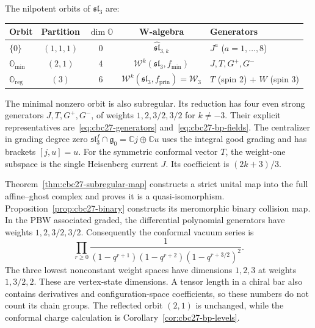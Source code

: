 \begin{computation}
\label{comp:sl3-ds-hierarchy}
The nilpotent orbits of $\mathfrak{sl}_3$ are:
\begin{center}
\renewcommand{\arraystretch}{1.2}
\begin{tabular}{lcccl}
\textbf{Orbit} & \textbf{Partition} & \textbf{$\dim \mathbb{O}$} &
\textbf{W-algebra} & \textbf{Generators} \\
\hline
$\{0\}$ & $(1,1,1)$ & $0$ & $\widehat{\mathfrak{sl}}_{3,k}$ &
$J^a$ ($a = 1,\ldots,8$) \\
$\mathbb{O}_{\min}$ & $(2,1)$ & $4$ &
$\mathcal{W}^k(\mathfrak{sl}_3, f_{\min})$ &
$J,T,G^+,G^-$ \\
$\mathbb{O}_{\mathrm{reg}}$ & $(3)$ & $6$ &
$\mathcal{W}^k(\mathfrak{sl}_3, f_{\mathrm{prin}}) = \mathcal{W}_3$ &
$T$ (spin 2) + $W$ (spin 3)
\end{tabular}
\end{center}

The minimal nonzero orbit is also subregular.
Its reduction has four even strong generators $J,T,G^+,G^-$, of weights $1,2,3/2,3/2$ for $k\ne-3$.
Their explicit representatives are~\eqref{eq:cbc27-generators} and~\eqref{eq:cbc27-bp-fields}.
The centralizer in grading degree zero $\mathfrak{sl}_3^f\cap\mathfrak g_0=\mathbb Cj\oplus\mathbb Cu$
uses the integral good grading and has brackets $[j,u]=u$.
For the symmetric conformal vector $T$, the weight-one subspace is the single Heisenberg current $J$.
Its coefficient is $(2k+3)/3$.

Theorem~\ref{thm:cbc27-subregular-map} constructs a strict unital map into the full affine--ghost complex and proves it is a quasi-isomorphism.
Proposition~\ref{prop:cbc27-binary} constructs its meromorphic binary collision map.
In the PBW associated graded, the differential polynomial generators have weights $1,2,3/2,3/2$.
Consequently the conformal vacuum series is
\[
 \prod_{r\geq0}\frac{1}{(1-q^{r+1})(1-q^{r+2})(1-q^{r+3/2})^2}.
\]
The three lowest nonconstant weight spaces have dimensions $1,2,3$ at weights $1,3/2,2$.
These are vertex-state dimensions.
A tensor length in a chiral bar also contains derivatives and configuration-space coefficients, so these numbers do not count its chain groups.
The reflected orbit $(2,1)$ is unchanged, while the conformal charge calculation is Corollary~\ref{cor:cbc27-bp-levels}.
\end{computation}

